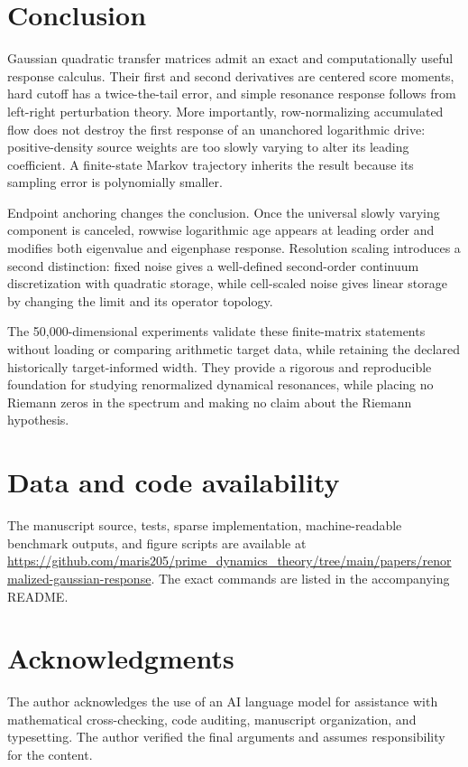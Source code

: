 \documentclass[11pt]{article}
\theoremstyle{definition}
\theoremstyle{remark}
\begin{document}
\section{Conclusion}

Gaussian quadratic transfer matrices admit an exact and computationally
useful response calculus.  Their first and second derivatives are centered
score moments, hard cutoff has a twice-the-tail error, and simple resonance
response follows from left-right perturbation theory.  More importantly,
row-normalizing accumulated flow does not destroy the first response of an
unanchored logarithmic drive: positive-density source weights are too slowly
varying to alter its leading coefficient.  A finite-state Markov trajectory
inherits the result because its sampling error is polynomially smaller.

Endpoint anchoring changes the conclusion.  Once the universal slowly
varying component is canceled, rowwise logarithmic age appears at leading
order and modifies both eigenvalue and eigenphase response.  Resolution
scaling introduces a second distinction: fixed noise gives a well-defined
second-order continuum discretization with quadratic storage, while
cell-scaled noise gives linear storage by changing the limit and its
operator topology.

The 50,000-dimensional experiments validate these finite-matrix statements
without loading or comparing arithmetic target data, while retaining the
declared historically target-informed width.  They provide a rigorous and
reproducible foundation for studying renormalized dynamical resonances, while
placing no Riemann zeros in the spectrum and making no claim about the
Riemann hypothesis.

\section*{Data and code availability}

The manuscript source, tests, sparse implementation, machine-readable
benchmark outputs, and figure scripts are available at
\url{https://github.com/maris205/prime_dynamics_theory/tree/main/papers/renormalized-gaussian-response}.
The exact commands are listed in the accompanying README.

\section*{Acknowledgments}

The author acknowledges the use of an AI language model for assistance with
mathematical cross-checking, code auditing, manuscript organization, and
typesetting.  The author verified the final arguments and assumes
responsibility for the content.

{\small


}
\end{document}
